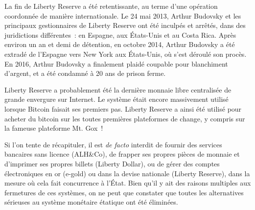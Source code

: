 La fin de Liberty Reserve a été retentissante, au terme d'une opération coordonnée de manière internationale. Le 24 mai 2013, Arthur Budovsky et les principaux gestionnaires de Liberty Reserve ont été inculpés et arrêtés, dans des juridictions différentes~: en Espagne, aux États-Unis et au Costa Rica. Après environ un an et demi de détention, en octobre 2014, Arthur Budovsky a été extradé de l'Espagne vers New York aux États-Unis, où s'est déroulé son procès. En 2016, Arthur Budovsky a finalement plaidé coupable pour blanchiment d'argent, et a été condamné à 20 ans de prison ferme.

Liberty Reserve a probablement été la dernière monnaie libre centralisée de grande envergure sur Internet. Le système était encore massivement utilisé lorsque Bitcoin faisait ses premiers pas. Liberty Reserve a ainsi été utilisé pour acheter du bitcoin sur les toutes premières plateformes de change, y compris sur la fameuse plateforme Mt. Gox~!


Si l'on tente de récapituler, il est \emph{de facto} interdit de fournir des services bancaires sans licence (ALH\&Co), de frapper ses propres pièces de monnaie et d'imprimer ses propres billets (Liberty Dollar), ou de gérer des comptes électroniques en or (e-gold) ou dans la devise nationale (Liberty Reserve), dans la mesure où cela fait concurrence à l'État. Bien qu'il y ait des raisons multiples aux fermetures de ces systèmes, on ne peut que constater que toutes les alternatives sérieuses au système monétaire étatique ont été éliminées.

